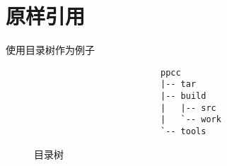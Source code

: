 \documentclass[12pt,a4paper]{article}
\begin{document}
\section{原样引用}
使用目录树作为例子
\setlength{\unitlength}{1mm}
\begin{figure}[!hbp]
\begin{verbatim}
                         ppcc
                         |-- tar
                         |-- build
                         |   |-- src
                         |   `-- work
                         `-- tools
\end{verbatim}
\caption{目录树\label{目录树}}
\end{figure}
\end{document}
